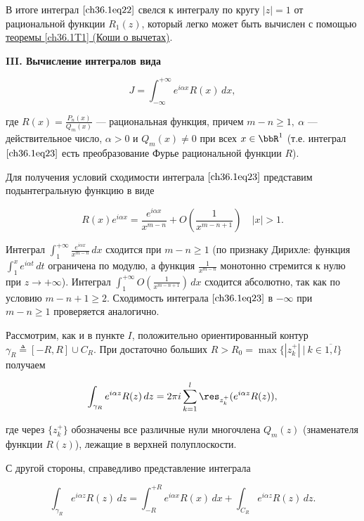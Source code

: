 В итоге интеграл $\eqref{ch36.1eq22}$ свелся к интегралу по кругу $|z| = 1$ от рациональной функции $R_1(z)$, который легко может быть вычислен с помощью  \hyperref[ch36.1T1]{теоремы \ref{ch36.1T1} (Коши о вычетах)}.

{\bf III. Вычисление интегралов вида}

\begin{equation} \label{ch36.1eq23}
J = \int_{-\infty}^{+\infty} e^{i\alpha x} R(x) \,dx,
\end{equation}

где $R(x) = \frac{P_n(x)}{Q_m(x)}$ --- рациональная функция, причем $m - n \ge 1, \: \alpha$ --- действительное число, $\alpha > 0$ и $Q_m(x) \not= 0$ при всех $x \in \bbR^1$ (т.е. интеграл $\eqref{ch36.1eq23}$ есть преобразование Фурье рациональной функции $R$).

Для получения условий сходимости интеграла $\eqref{ch36.1eq23}$ представим подынтегральную функцию в виде

$$
R(x) e^{i \alpha x} = \frac{e^{i \alpha x}}{x^{m - n}} + O \left( \frac{1}{x^{m - n + 1}} \right) \quad |x| > 1.
$$

Интеграл $\int_1^{+\infty} \frac{e^{i \alpha x}}{x^{m - n}} \,dx$ сходится при $m - n \ge 1$ (по признаку Дирихле: функция $\int_1^x e^{i\alpha t}\,dt$ ограничена по модулю, а функция $\frac{1}{x^{m - n}}$ монотонно стремится к нулю при $z \to +\infty$). Интеграл 
$\int_{1}^{+\infty} O \left( \frac{1}{x^{m - n + 1}} \right)\,dx$ сходится абсолютно, так как по условию $m - n + 1 \ge 2$. Сходимость интеграла $\eqref{ch36.1eq23}$ в $-\infty$ при $m - n \ge 1$ проверяется аналогично.

Рассмотрим, как и в пункте $I$, положительно ориентированный контур $\gamma_R \triangleq [-R,R] \cup C_R$. При достаточно больших $R > R_0 = \max \{ |z_k^+| \: \big| \: k \in \overline{1,l} \}$ получаем

\begin{equation} \label{ch36.1eq24}
\int_{\gamma_R} e^{i \alpha z}R(z) \,dz = 2\pi i \sum_{k = 1}^l \res_{z_k^+} (e^{i\alpha z}R(z)),
\end{equation}

где через $\{ z_k^+ \}$ обозначены все различные нули многочлена $Q_m(z)$ (знаменателя функции $R(z)$), лежащие в верхней полуплоскости.

С другой стороны, справедливо представление интеграла 

\begin{equation} \label{ch36.1eq25}
\int_{\gamma_R} e^{i \alpha z}R(z)\,dz = \int_{-R}^{+R} e^{i \alpha x}R(x)\,dx + \int_{C_R} e^{i \alpha z} R(z)\,dz.
\end{equation}


